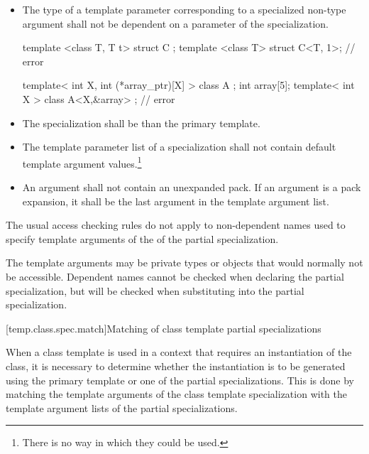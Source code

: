 \begin{itemize}
\item
The type of a template parameter corresponding to a specialized non-type argument
shall not be dependent on a parameter of the specialization.
\begin{example}
\begin{codeblock}
template <class T, T t> struct C {};
template <class T> struct C<T, 1>;              // error

template< int X, int (*array_ptr)[X] > class A {};
int array[5];
template< int X > class A<X,&array> { };        // error
\end{codeblock}

\end{example}
\item
The specialization shall be 
than the primary template.

\item
The template parameter list of a specialization shall not contain default
template argument values.\footnote{There is no way in which they could be used.}
\item
An argument shall not contain an unexpanded pack. If
an argument is a pack expansion, it shall be
the last argument in the template argument list.
\end{itemize}

\pnum
The usual access checking rules do not apply to non-dependent names
used to specify template arguments of the 
of the partial specialization.
\begin{note}
The template arguments may be private types or
objects that would normally not be accessible.
Dependent names cannot be checked when declaring the partial specialization,
but will be checked when substituting into the partial specialization.
\end{note}

[temp.class.spec.match]{Matching of class template partial specializations}

\pnum
When a class template is used in a context that requires an instantiation of
the class,
it is necessary to determine whether the instantiation is to be generated
using the primary template or one of the partial specializations.
This is done by matching the template arguments of the class template
specialization with the template argument lists of the partial
specializations.

